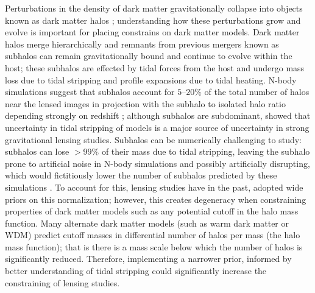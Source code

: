  Perturbations in the density of dark matter gravitationally collapse into objects known as dark matter halos \cite{press1974formation}; understanding how these perturbations grow and evolve is important for placing constrains on dark matter models.  
 Dark matter halos merge hierarchically and remnants from previous mergers known as subhalos can remain gravitationally bound and continue to evolve within the host; these subhalos are effected by tidal forces from the host and undergo mass loss due to tidal stripping and profile expansions due to tidal heating. 
 N-body simulations suggest that subhalos account for $5$--$20\%$ of the total number of halos near the lensed images in projection with the subhalo to isolated halo ratio depending strongly on redshift \cite{10.1093/mnras/stu2673, 10.1093/mnras/sty159}; although subhalos are subdominant, \citet{gilman2024turbocharging} showed that uncertainty in tidal stripping of models is a major source of uncertainty in strong gravitational lensing studies. 
 Subhalos can be numerically challenging to study: subhalos can lose $>99\%$ of their mass due to tidal stripping, leaving the subhalo prone to artificial noise in N-body simulations and possibly artificially disrupting, which would fictitiously lower the number of subhalos predicted by these simulations \cite{errani2021asymptotic}.
 To account for this, lensing studies have in the past, adopted wide priors on this normalization; however, this creates degeneracy when constraining properties of dark matter models such as any potential cutoff in the halo mass function. 
 Many alternate dark matter models (such as warm dark matter or WDM) predict cutoff masses in differential number of halos per mass (the halo mass function); that is there is a mass scale below which the number of halos is significantly reduced.
 Therefore, implementing a narrower prior, informed by better understanding of tidal stripping could significantly increase the constraining of lensing studies. 
 
